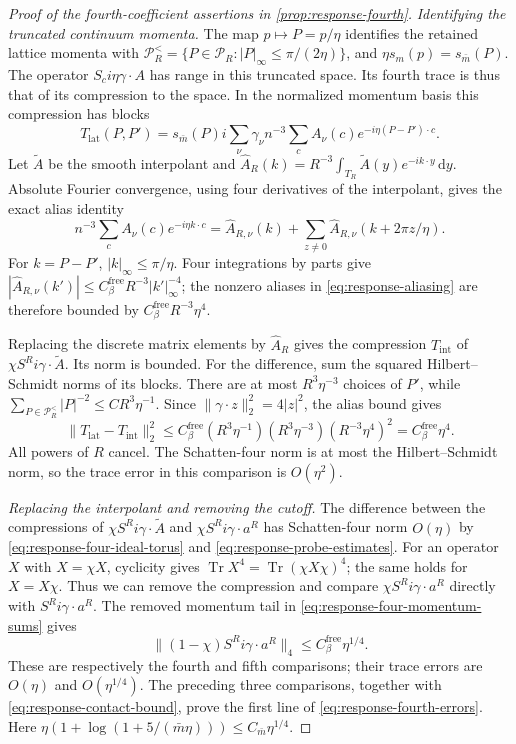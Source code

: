 \documentclass[11pt,letterpaper,reqno]{amsart}
\newcommand{\dd}{\mathrm d}
\begin{document}
\begin{proof}[Proof of the fourth-coefficient assertions in \cref{prop:response-fourth}]
\emph{Identifying the truncated continuum momenta.}
The map $p\mapsto P=p/\eta$ identifies the retained
lattice momenta with
$\mathcal P_R^<=\{P\in\mathcal P_R:|P|_\infty\le\pi/(2\eta)\}$,
and $\eta s_m(p)=s_{\bar m}(P)$. The operator
$S_ci\eta\gamma\cdot A$ has range in this truncated
space. Its fourth trace is thus that of its compression
to the space. In the normalized momentum basis this
compression has blocks
\[
 T_{\mathrm{lat}}(P,P')=s_{\bar m}(P)i\sum_\nu\gamma_\nu
                 n^{-3}\sum_cA_\nu(c)e^{-i\eta(P-P')\cdot c}.
\]
Let $\widetilde A$ be the smooth interpolant and
$\widehat A_R(k)=R^{-3}\int_{T_R}\widetilde A(y)e^{-ik\cdot y}\,\dd y$.
Absolute Fourier convergence, using four derivatives
of the interpolant, gives the exact alias identity
\begin{equation}\label{eq:response-aliasing}
 n^{-3}\sum_cA_\nu(c)e^{-i\eta k\cdot c}
    =\widehat A_{R,\nu}(k)+
          \sum_{z\ne0}\widehat A_{R,\nu}(k+2\pi z/\eta).
\end{equation}
For $k=P-P'$, $|k|_\infty\le\pi/\eta$. Four integrations
by parts give
$|\widehat A_{R,\nu}(k')|\le C_\beta^{\mathrm{free}} R^{-3}|k'|_\infty^{-4}$;
the nonzero aliases in \eqref{eq:response-aliasing} are
therefore bounded by $C_\beta^{\mathrm{free}} R^{-3}\eta^4$.

Replacing the discrete matrix elements by $\widehat A_R$
gives the compression $T_{\mathrm{int}}$ of
$\chi S^Ri\gamma\cdot\widetilde A$. Its norm is bounded.
For the difference, sum the squared Hilbert--Schmidt
norms of its blocks. There are at most $R^3\eta^{-3}$
choices of $P'$, while
$\sum_{P\in\mathcal P_R^<}|P|^{-2}\le CR^3\eta^{-1}$.
Since $\|\gamma\cdot z\|_2^2=4|z|^2$, the alias bound
gives
\[
 \|T_{\mathrm{lat}}-T_{\mathrm{int}}\|_2^2
     \le C_\beta^{\mathrm{free}}(R^3\eta^{-1})(R^3\eta^{-3})
                                     (R^{-3}\eta^4)^2
     =C_\beta^{\mathrm{free}}\eta^4.
\]
All powers of $R$ cancel. The Schatten-four norm is
at most the Hilbert--Schmidt norm, so the trace error
in this comparison is $O(\eta^2)$.

\emph{Replacing the interpolant and removing the cutoff.}
The difference between the compressions of
$\chi S^Ri\gamma\cdot\widetilde A$ and
$\chi S^Ri\gamma\cdot a^R$ has Schatten-four norm
$O(\eta)$ by \eqref{eq:response-four-ideal-torus} and
\eqref{eq:response-probe-estimates}. For an operator
$X$ with $X=\chi X$, cyclicity gives
$\operatorname{Tr}X^4=\operatorname{Tr}(\chi X\chi)^4$;
the same holds for $X=X\chi$. Thus we can remove the
compression and compare $\chi S^Ri\gamma\cdot a^R$
directly with $S^Ri\gamma\cdot a^R$. The removed momentum
tail in \eqref{eq:response-four-momentum-sums} gives
\[
 \|(1-\chi)S^Ri\gamma\cdot a^R\|_4\le C_\beta^{\mathrm{free}}\eta^{1/4}.
\]
These are respectively the fourth and fifth comparisons;
their trace errors are $O(\eta)$ and $O(\eta^{1/4})$.
The preceding three comparisons, together with
\eqref{eq:response-contact-bound}, prove the first line
of \eqref{eq:response-fourth-errors}. Here
$\eta(1+\log(1+5/(\bar m\eta)))\le C_{\bar m}\eta^{1/4}$.


\end{proof}
\end{document}

